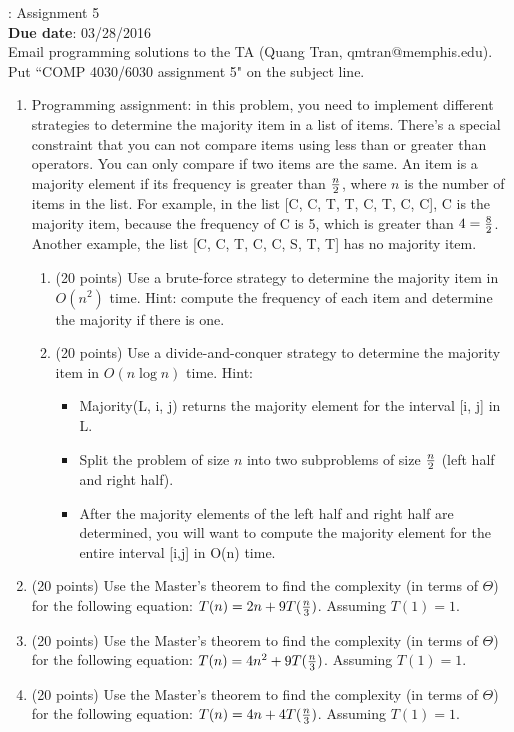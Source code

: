 \documentclass[11pt, oneside]{article}    %
\newcommand{\hw}[2]{\noindent {\bf COMP 4030/6030}: Assignment #1\\
{\bf Due date}: #2\\}
\begin{document}
\hw{5}{03/28/2016}

Email programming solutions to the TA (Quang Tran, qmtran@memphis.edu).  Put ``COMP 4030/6030 assignment 5" on the subject line.
\begin{enumerate}
	\item Programming assignment: in this problem, you need to implement different strategies to determine the majority item in a list of items.  There's a special constraint that you can not compare items using less than or greater than operators.  You can only compare if two items are the same.  An item is a majority element if its frequency is greater than ${n \over 2}$, where $n$ is the number of items in the list.  For example, in the list [C, C, T, T, C, T, C, C], C is the majority item, because the frequency of C is 5, which is greater than $4 = {8 \over 2}$.  Another example, the list [C, C, T, C, C, S, T, T] has no majority item.
		\begin{enumerate}
		\item (20 points) Use a brute-force strategy to determine the majority item in $O(n^2)$ time.  Hint: compute the frequency of each item and determine the majority if there is one.
		\item (20 points) Use a divide-and-conquer strategy to determine the majority item in $O(n \log n)$ time.  Hint: 
			\begin{itemize}
			\item Majority(L, i, j) returns the majority element for the interval [i, j] in L.
			\item Split the problem of size $n$ into two subproblems of size ${n \over 2}$ (left half and right half).
			\item After the majority elements of the left half and right half are determined, you will want to compute the majority element for the entire interval [i,j] in O(n) time.				
			\end{itemize}
		\end{enumerate}
	\item (20 points) Use the Master's theorem to find the complexity (in terms of $\Theta$) for the following equation: $T(n) = 2n + 9T({n \over 3})$.  Assuming $T(1) = 1$.
	\item (20 points) Use the Master's theorem to find the complexity (in terms of $\Theta$) for the following equation: $T(n) = 4n^2 + 9T({n \over 3})$.  Assuming $T(1) = 1$.
	\item (20 points) Use the Master's theorem to find the complexity (in terms of $\Theta$) for the following equation: $T(n) = 4n + 4T({n \over 3})$.  Assuming $T(1) = 1$.
\end{enumerate}
\end{document}
